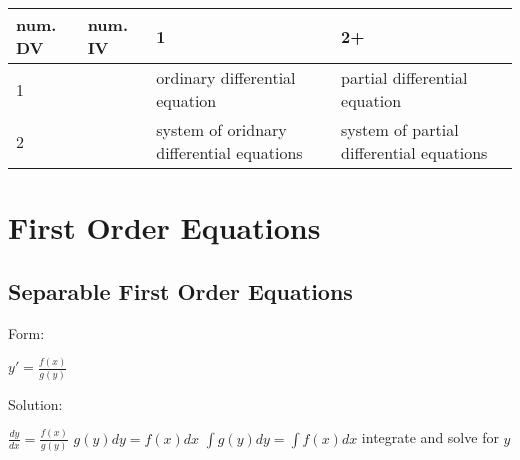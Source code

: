 \documentclass[12 pt, oneside]{book}
\begin{document}
\begin{tabular}{|p{.15\linewidth}|p{.15\linewidth}|p{.35\linewidth}|p{.35\linewidth}|}
  \hline
  num. DV & num. IV & 1 & 2+\\
  \hline
  1 & &ordinary differential equation & partial differential equation\\
  \hline
  2 & &system of oridnary differential equations & system of partial differential equations\\
  \hline
\end{tabular}

\chapter{First Order Equations}
\section{Separable First Order Equations}
Form:
\begin{mathline}
$y'=\frac{f(x)}{g(y)}$
\end{mathline}
Solution:
\begin{mathline}
$\frac{dy}{dx}=\frac{f(x)}{g(y)}$\newline{}
$g(y)dy=f(x)dx$\newline{}
$\int g(y)dy = \int f(x)dx$\newline{}
integrate and solve for $y$  
\end{mathline}
\end{document}
